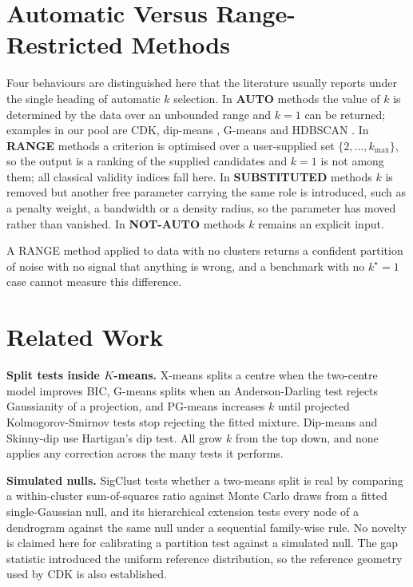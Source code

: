 \documentclass[runningheads]{llncs}
\begin{document}
\section{Automatic Versus Range-Restricted Methods}
\label{sec:auto}

Four behaviours are distinguished here that the literature usually reports
under the single heading of automatic $k$ selection. In \textbf{AUTO} methods
the value of $k$ is determined by the data over an unbounded range and $k=1$
can be returned; examples in our pool are CDK, dip-means
\cite{kalogeratos2012dipmeans}, G-means \cite{hamerly2003gmeans} and HDBSCAN
\cite{campello2013hdbscan}. In \textbf{RANGE} methods a criterion is optimised
over a user-supplied set $\{2,\dots,k_{\max}\}$, so the output is a ranking of
the supplied candidates and $k=1$ is not among them; all classical validity
indices fall here. In \textbf{SUBSTITUTED} methods $k$ is removed but another
free parameter carrying the same role is introduced, such as a penalty weight,
a bandwidth or a density radius, so the parameter has moved rather than
vanished. In \textbf{NOT-AUTO} methods $k$ remains an explicit input.

A RANGE method applied to data with no clusters returns a confident partition
of noise with no signal that anything is wrong, and a benchmark with no
$k^\star=1$ case cannot measure this difference.

\section{Related Work}
\label{sec:related}

\noindent\textbf{Split tests inside $K$-means.} X-means
\cite{pelleg2000xmeans} splits a centre when the two-centre model improves
BIC, G-means \cite{hamerly2003gmeans} splits when an Anderson-Darling test
rejects Gaussianity of a projection, and PG-means \cite{feng2006pgmeans}
increases $k$ until projected Kolmogorov-Smirnov tests stop rejecting the
fitted mixture. Dip-means \cite{kalogeratos2012dipmeans} and Skinny-dip
\cite{maurus2016skinnydip} use Hartigan's dip test. All grow $k$ from the top
down, and none applies any correction across the many tests it performs.

\medskip\noindent\textbf{Simulated nulls.} SigClust \cite{liu2008sigclust}
tests whether a two-means split is real by comparing a within-cluster
sum-of-squares ratio against Monte Carlo draws from a fitted single-Gaussian
null, and its hierarchical extension \cite{kimes2017shc} tests every node of a
dendrogram against the same null under a sequential family-wise rule. No novelty is
claimed here for calibrating a partition test against a simulated null. The gap
statistic \cite{tibshirani2001gap} introduced the uniform reference
distribution, so the reference geometry used by CDK is also established.
\end{document}
